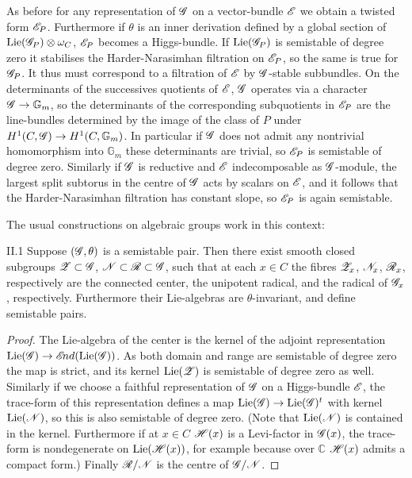 \documentclass[12pt,english]{smfart}
\theoremstyle{plain} \newtheorem{innerthm}{Theorem} \newtheorem{innerlem}{Lemma} \newtheorem{innerprop}{Proposition} \newtheorem{innercor}{Corollary} \theoremstyle{definition} \newtheorem{innerdefn}{Definition} \newtheorem{innerconstr}{Construction} \theoremstyle{remark} \newtheorem*{remark}{Remark} \newtheorem*{remarks}{Remarks} \newtheorem*{applications}{Applications}
\begin{document}
As before for any representation of $\mathscr{G}$ on a vector-bundle $\mathscr{E}$ we obtain a twisted form $\mathscr{E}_P$. Furthermore if $\theta$ is an inner derivation defined by a global section of $\operatorname{Lie}(\mathscr{G}_P)\otimes\omega_C$, $\mathscr{E}_P$ becomes a Higgs-bundle. If $\operatorname{Lie}(\mathscr{G}_P)$ is semistable of degree zero it stabilises the Harder-Narasimhan filtration on $\mathscr{E}_P$, so the same is true for $\mathscr{G}_P$. It thus must correspond to a filtration of $\mathscr{E}$ by $\mathscr{G}$-stable subbundles. On the determinants of the successives quotients of $\mathscr{E}$, $\mathscr{G}$ operates via a character $\mathscr{G}\to\mathbb{G}_m$, so the determinants of the corresponding subquotients in $\mathscr{E}_P$ are the line-bundles determined by the image of the class of $P$ under $H^1(C,\mathscr{G})\to H^1(C,\mathbb{G}_m)$. In particular if $\mathscr{G}$ does not admit any nontrivial homomorphism into $\mathbb{G}_m$ these determinants are trivial, so $\mathscr{E}_P$ is semistable of degree zero. Similarly if $\mathscr{G}$ is reductive and $\mathscr{E}$ indecomposable as $\mathscr{G}$-module, the largest split subtorus in the centre of $\mathscr{G}$ acts by scalars on $\mathscr{E}$, and it follows that the Harder-Narasimhan filtration has constant slope, so $\mathscr{E}_P$ is again semistable.

The usual constructions on algebraic groups work in this context:

\begin{lemma}{II.1}\label{lem:II.1}
Suppose $(\mathscr{G},\theta)$ is a semistable pair. Then there exist smooth closed subgroups $\mathscr{Z}\subset\mathscr{G}$, $\mathscr{N}\subset\mathscr{R}\subset\mathscr{G}$, such that at each $x\in C$ the fibres $\mathscr{Z}_x$, $\mathscr{N}_x$, $\mathscr{R}_x$, respectively are the connected center, the unipotent radical, and the radical of $\mathscr{G}_x$, respectively. Furthermore their Lie-algebras are $\theta$-invariant, and define semistable pairs.
\end{lemma}

\begin{proof}
The Lie-algebra of the center is the kernel of the adjoint representation $\operatorname{Lie}(\mathscr{G})\to\mathscr{E}\!nd(\operatorname{Lie}(\mathscr{G}))$. As both domain and range are semistable of degree zero the map is strict, and its kernel $\operatorname{Lie}(\mathscr{Z})$ is semistable of degree zero as well. Similarly if we choose a faithful representation of $\mathscr{G}$ on a Higgs-bundle $\mathscr{E}$, the trace-form of this representation defines a map $\operatorname{Lie}(\mathscr{G})\to\operatorname{Lie}(\mathscr{G})^t$ with kernel $\operatorname{Lie}(\mathscr{N})$, so this is also semistable of degree zero. (Note that $\operatorname{Lie}(\mathscr{N})$ is contained in the kernel. Furthermore if at $x\in C$ $\mathscr{H}(x)$ is a Levi-factor in $\mathscr{G}(x)$, the trace-form is nondegenerate on $\operatorname{Lie}(\mathscr{H}(x))$, for example because over $\mathbb{C}$ $\mathscr{H}(x)$ admits a compact form.) Finally $\mathscr{R}/\mathscr{N}$ is the centre of $\mathscr{G}/\mathscr{N}$.
\end{proof}
\end{document}
